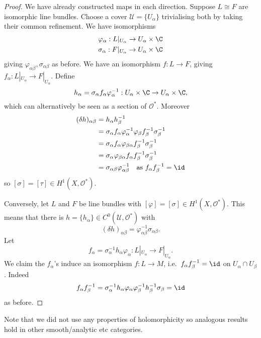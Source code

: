 \documentclass[a4paper]{article}
\begin{document}
\begin{proof}
  We have already constructed maps in each direction. Suppose \(L \cong F\) are isomorphic line bundles. Choose a cover \(\mathcal U = \{U_\alpha\}\) trivialising both by taking their common refinement. We have isomorphisms
  \begin{align*}
    \varphi_\alpha: L|_{U_\alpha} &\to U_\alpha \times \C \\
    \sigma_\alpha: F|_{U_\alpha} &\to U_\alpha \times \C \\
  \end{align*}
  giving \(\varphi_{\alpha\beta}, \sigma_{\alpha\beta}\) as before. We have an isomorphism \(f: L \to F\), giving \(f_\alpha: L|_{U_\alpha} \to F|_{U_\alpha}\). Define
  \[
    h_\alpha = \sigma_\alpha f_\alpha \varphi_\alpha^{-1}: U_\alpha \times \C \to U_\alpha \times \C,
  \]
  which can alternatively be seen as a section of \(\mathcal O^*\). Moreover
  \begin{align*}
    (\delta h)_{\alpha\beta}
    &= h_\alpha h_\beta^{-1} \\
    &= \sigma_\alpha f_\alpha \varphi_\alpha^{-1} \varphi_\beta f_\beta^{-1} \sigma_\beta^{-1} \\
    &= \sigma_\alpha f_\alpha \varphi_{\beta\alpha} f_\beta^{-1} \sigma_\beta^{-1} \\
    &= \sigma_\alpha \varphi_{\beta\alpha} f_\alpha f_\beta^{-1} \sigma_\beta^{-1} \\
    &= \sigma_{\alpha\beta} \varphi_{\alpha\beta}^{-1} \quad \text{as } f_\alpha f_\beta^{-1} = \id
  \end{align*}
  so \([\sigma] = [\tau] \in H^1(X, \mathcal O^*)\).

  Conversely, let \(L\) and \(F\) be line bundles with \([\varphi] = [\sigma] \in H^1(X, \mathcal O^*)\). This means that there is \(h = \{h_\alpha\} \in C^0(\mathcal U, \mathcal O^*)\) with
  \[
    (\delta h)_{\alpha\beta} = \varphi_{\alpha\beta}^{-1} \sigma_{\alpha\beta}.
  \]
  Let
  \[
    f_\alpha = \sigma_\alpha^{-1} h_\alpha \varphi_\alpha: L|_{U_\alpha} \to F|_{U_\alpha}.
  \]
  We claim the \(f_\alpha\)'s induce an isomorphism \(f: L \to M\), i.e.\ \(f_\alpha f_\beta^{-1} = \id\) on \(U_\alpha \cap U_\beta\). Indeed
  \[
    f_\alpha f_\beta^{-1} = \sigma_\alpha^{-1} h_\alpha \varphi_\alpha \varphi_\beta^{-1} h_\beta^{-1} \sigma_\beta = \id
  \]
  as before.
\end{proof}

Note that we did not use any properties of holomorphicity so analogous results hold in other smooth/analytic etc categories.
\end{document}
